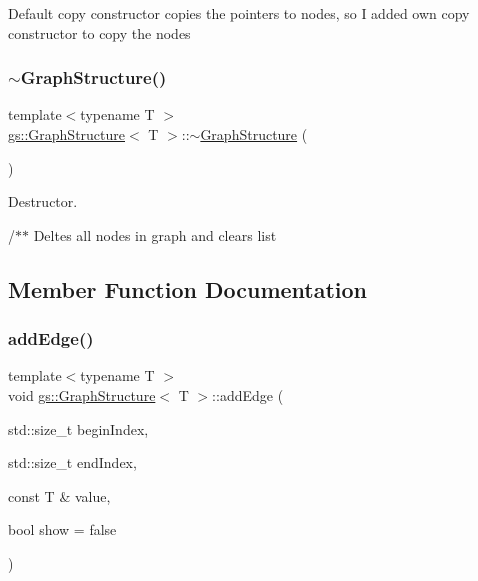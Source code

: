 Default copy constructor copies the pointers to nodes, so I added own copy constructor to copy the nodes \mbox{\label{classgs_1_1_graph_structure_aadb408a61239261f483de8d603263475}} 
\subsubsection{\texorpdfstring{$\sim$\+Graph\+Structure()}{~GraphStructure()}}
{\footnotesize\ttfamily template$<$typename T $>$ \\
\mbox{\hyperlink{classgs_1_1_graph_structure}{gs\+::\+Graph\+Structure}}$<$ T $>$\+::$\sim$\mbox{\hyperlink{classgs_1_1_graph_structure}{Graph\+Structure}} (\begin{DoxyParamCaption}{ }\end{DoxyParamCaption})}



Destructor. 

/$\ast$$\ast$ Deltes all nodes in graph and clears \textquotesingle{}list\textquotesingle{} 

\subsection{Member Function Documentation}
\mbox{\label{classgs_1_1_graph_structure_af917d0945351f897f5de14d0ea527170}} 
\subsubsection{\texorpdfstring{add\+Edge()}{addEdge()}}
{\footnotesize\ttfamily template$<$typename T $>$ \\
void \mbox{\hyperlink{classgs_1_1_graph_structure}{gs\+::\+Graph\+Structure}}$<$ T $>$\+::add\+Edge (\begin{DoxyParamCaption}\item[{std\+::size\+\_\+t}]{begin\+Index,  }\item[{std\+::size\+\_\+t}]{end\+Index,  }\item[{const T \&}]{value,  }\item[{bool}]{show = {\ttfamily false} }\end{DoxyParamCaption})}



